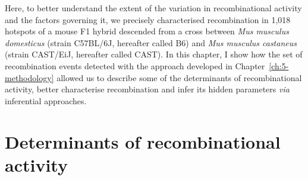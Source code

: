 %

Here, to better understand the extent of the variation in recombinational activity and the factors governing it, we precisely characterised recombination in 1,018 hotspots of a mouse F1 hybrid descended from a cross between \textit{Mus musculus domesticus} (strain C57BL/6J, hereafter called B6) and \textit{Mus musculus castaneus} (strain CAST/EiJ, hereafter called CAST).
In this chapter, I show how the set of recombination events detected with the approach developed in Chapter~\ref{ch:5-methodology} allowed us to describe some of the determinants of recombinational activity, better characterise recombination and infer its hidden parameters \textit{via} inferential approaches.
%




\section{Determinants of recombinational activity}

